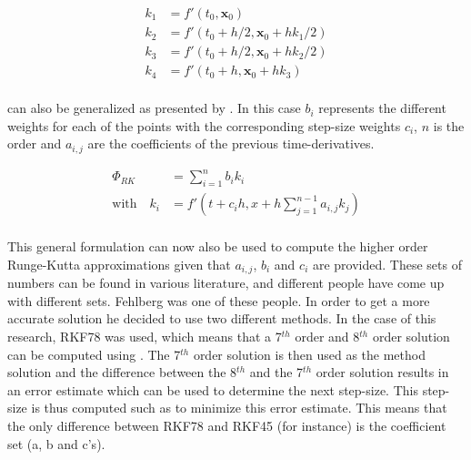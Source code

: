 \begin{equation} \label{eq:k}
\begin{split}
k_{1}&=f'\left(t_{0},\mathbf{x}_{0}\right)\\
k_{2}&=f'\left(t_{0}+h/2,\mathbf{x}_{0}+hk_{1}/2\right)\\
k_{3}&=f'\left(t_{0}+h/2,\mathbf{x}_{0}+hk_{2}/2\right)\\
k_{4}&=f'\left(t_{0}+h,\mathbf{x}_{0}+hk_{3}\right)\\
\end{split}
\end{equation}


 can also be generalized as presented by . In this case $b_{i}$ represents the different weights for each of the points with the corresponding step-size weights $c_{i}$, $n$ is the order and $a_{i,j}$ are the coefficients of the previous time-derivatives.

\begin{equation} \label{eq:generalRK}
\begin{split}
\Phi_{RK} &= \displaystyle \sum^{n}_{i=1}b_{i}k_{i} \\
\text{with}\quad k_{i} &= f'\left(t+c_{i}h,x+h\displaystyle \sum^{n-1}_{j=1}a_{i,j}k_{j} \right) \\
\end{split}
\end{equation}


This general formulation can now also be used to compute the higher order Runge-Kutta approximations given that $a_{i,j}$, $b_{i}$ and $c_{i}$ are provided. These sets of numbers can be found in various literature, and different people have come up with different sets. Fehlberg was one of these people. In order to get a more accurate solution he decided to use two different methods. In the case of this research, \ac{RKF78} was used, which means that a 7$^{th}$ order and 8$^{th}$ order solution can be computed using . The 7$^{th}$ order solution is then used as the method solution and the difference between the 8$^{th}$ and the 7$^{th}$ order solution results in an error estimate which can be used to determine the next step-size. This step-size is thus computed such as to minimize this error estimate. This means that the only difference between \ac{RKF78} and \ac{RKF45} (for instance) is the coefficient set (a, b and c's). 









